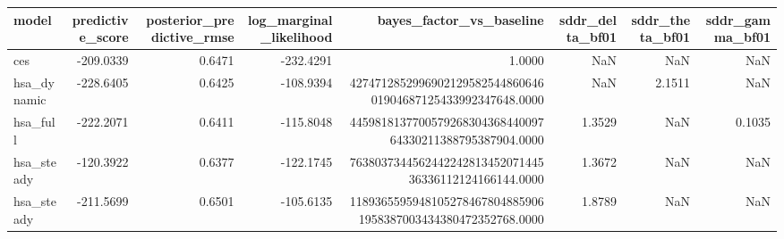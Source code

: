\begin{tabular}{lrrrrrrr}
\toprule
model & predictive\_score & posterior\_predictive\_rmse & log\_marginal\_likelihood & bayes\_factor\_vs\_baseline & sddr\_delta\_bf01 & sddr\_theta\_bf01 & sddr\_gamma\_bf01 \\
\midrule
ces & -209.0339 & 0.6471 & -232.4291 & 1.0000 & NaN & NaN & NaN \\
hsa\_dynamic & -228.6405 & 0.6425 & -108.9394 & 427471285299690212958254486064601904687125433992347648.0000 & NaN & 2.1511 & NaN \\
hsa\_full & -222.2071 & 0.6411 & -115.8048 & 445981813770057926830436844009764330211388795387904.0000 & 1.3529 & NaN & 0.1035 \\
hsa\_steady & -120.3922 & 0.6377 & -122.1745 & 763803734456244224281345207144536336112124166144.0000 & 1.3672 & NaN & NaN \\
hsa\_steady & -211.5699 & 0.6501 & -105.6135 & 11893655959481052784678048859061958387003434380472352768.0000 & 1.8789 & NaN & NaN \\
\bottomrule
\end{tabular}
